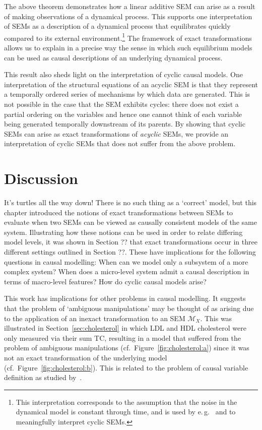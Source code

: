 The above theorem demonstrates how a linear additive SEM can arise as a result of making observations of a dynamical process.
This supports one interpretation of SEMs as a description of a dynamical process that equilibrates quickly compared to its external environment.\footnote{This interpretation corresponds to the assumption that the noise in the dynamical model is constant through time, and is used by e.\,g.\ \cite{lacerda2012discovering,Mooij_et_al_NIPS_11,hyttinen2012learning,mooij2013ode} and \cite{mooij2013cyclic} to meaningfully interpret cyclic SEMs.}
The framework of exact transformations allows us to explain in a precise way the sense in which such equilibrium models can be used as causal descriptions of an underlying dynamical process.

This result also sheds light on the interpretation of cyclic causal models.
One interpretation of the structural equations of an acyclic SEM is that they represent a temporally ordered series of mechanisms by which data are generated.
This is not possible in the case that the SEM exhibits cycles: there does not exist a partial ordering on the variables and hence one cannot think of each variable being generated temporally downstream of its parents.
By showing that cyclic SEMs can arise as exact transformations of \emph{acyclic} SEMs, we provide an interpretation of cyclic SEMs that does not suffer from the above problem.




\section{Discussion}

It's turtles all the way down!
There is no such thing as a `correct' model, but this chapter introduced the notions of exact transformations between SEMs to evaluate when two SEMs can be viewed as causally consistent models of the same system.
Illustrating how these notions can be used in order to relate differing model levels, it was shown in Section ?? that exact transformations occur in three different settings outlined in Section ??.
These have implications for the following questions in causal modelling: When can we model only a subsystem of a more complex system? When does a micro-level system admit a causal description in terms of macro-level features? How do cyclic causal models arise?

This work has implications for other problems in causal modelling.
It suggests that the problem of `ambiguous manipulations' \citep{spirtes2004causal} may be thought of as arising due to the application of an inexact transformation to an SEM $\mathcal{M}_X$.
This was illustrated in Section~\ref{sec:cholesterol} in which LDL and HDL cholesterol were only measured via their sum TC, resulting in a model that suffered from the problem of ambiguous manipulations (cf.\ Figure~\ref{fig:cholesterol:a}) since it was not an exact transformation of the underlying model (cf.\ Figure~\ref{fig:cholesterol:b}).
This is related to the problem of causal variable definition as studied by~\cite{eberhardt2016green}.

